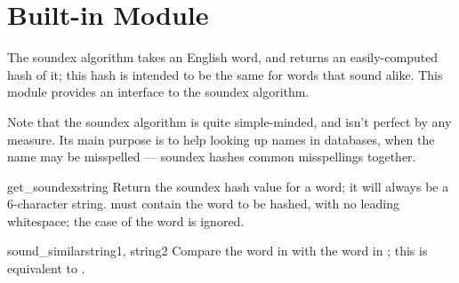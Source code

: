 \section{Built-in Module }
\label{module-soundex}

The soundex algorithm takes an English word, and returns an
easily-computed hash of it; this hash is intended to be the same for
words that sound alike.  This module provides an interface to the
soundex algorithm.

Note that the soundex algorithm is quite simple-minded, and isn't
perfect by any measure.  Its main purpose is to help looking up names
in databases, when the name may be misspelled --- soundex hashes common
misspellings together.

\begin{funcdesc}{get_soundex}{string}
Return the soundex hash value for a word; it will always be a
6-character string.   must contain the word to be hashed,
with no leading whitespace; the case of the word is ignored.
\end{funcdesc}

\begin{funcdesc}{sound_similar}{string1, string2}
Compare the word in  with the word in ; this
is equivalent to 
 \code{==}
.
\end{funcdesc}
